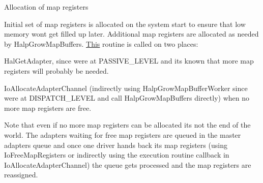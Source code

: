 \begin{DoxyItemize}
\item Allocation of map registers

Initial set of map registers is allocated on the system start to ensure that low memory won\textquotesingle{}t get filled up later. Additional map registers are allocated as needed by Halp\+Grow\+Map\+Buffers. \hyperlink{namespace_this}{This} routine is called on two places\+:
\begin{DoxyItemize}
\item Hal\+Get\+Adapter, since we\textquotesingle{}re at P\+A\+S\+S\+I\+V\+E\+\_\+\+L\+E\+V\+EL and it\textquotesingle{}s known that more map registers will probably be needed.
\item Io\+Allocate\+Adapter\+Channel (indirectly using Halp\+Grow\+Map\+Buffer\+Worker since we\textquotesingle{}re at D\+I\+S\+P\+A\+T\+C\+H\+\_\+\+L\+E\+V\+EL and call Halp\+Grow\+Map\+Buffers directly) when no more map registers are free.
\end{DoxyItemize}

Note that even if no more map registers can be allocated it\textquotesingle{}s not the end of the world. The adapters waiting for free map registers are queued in the master adapter\textquotesingle{}s queue and once one driver hands back it\textquotesingle{}s map registers (using Io\+Free\+Map\+Registers or indirectly using the execution routine callback in Io\+Allocate\+Adapter\+Channel) the queue gets processed and the map registers are reassigned. 
\end{DoxyItemize}